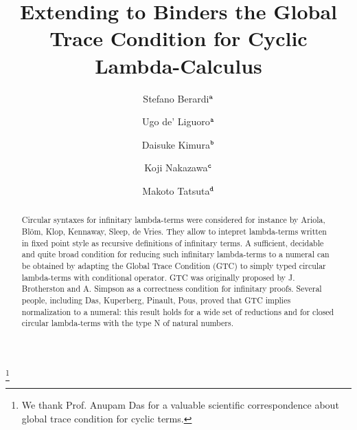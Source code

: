 \documentclass[twoside,11pt]{entics}
\begin{document}
\begin{frontmatter}
  \title{Extending to Binders the Global Trace Condition for Cyclic Lambda-Calculus} 
 \thanks[ALL]{We thank Prof. Anupam Das for a valuable scientific correspondence about 
 global trace condition for cyclic terms.}   %
  \author{Stefano Berardi$^{\tt a}$}	%
   \author{Ugo de' Liguoro$^{\tt a}$}		%
    \author{Daisuke Kimura$^{\tt b}$}
      \author{Koji Nakazawa$^{\tt c}$}
       \author{Makoto Tatsuta$^{\tt d}$}
   \address[a]{Computer Science Department, Turin University, Torino, Italy}  							
   \address[b]{Department of Information Science, Toho University, Japan} 
   \address[c]{Graduate School of Informatics, Nagoya University, Japan}
   \address[d]{National Institute of Informatics/Sokendai, Tokyo, Japan}
 
 
   
\begin{abstract} 
Circular syntaxes for infinitary lambda-terms
were considered for instance by Ariola, Bl\"{o}m, Klop, Kennaway, Sleep, de Vries.
They allow to intepret lambda-terms written in fixed point style 
as recursive definitions of infinitary terms. 
A sufficient, decidable and quite broad condition for reducing such 
infinitary lambda-terms to a numeral can be obtained
by adapting the Global Trace Condition (GTC) to simply typed 
circular lambda-terms with conditional operator. 
GTC was originally proposed by J. Brotherston and A. Simpson
as a correctness condition for infinitary proofs.
Several people, including Das, Kuperberg, Pinault, Pous,
proved that GTC implies normalization to a numeral:
this result holds for a wide set of reductions and for closed circular lambda-terms 
with the type N of natural numbers. 


\end{abstract}
\end{frontmatter}
\end{document}
